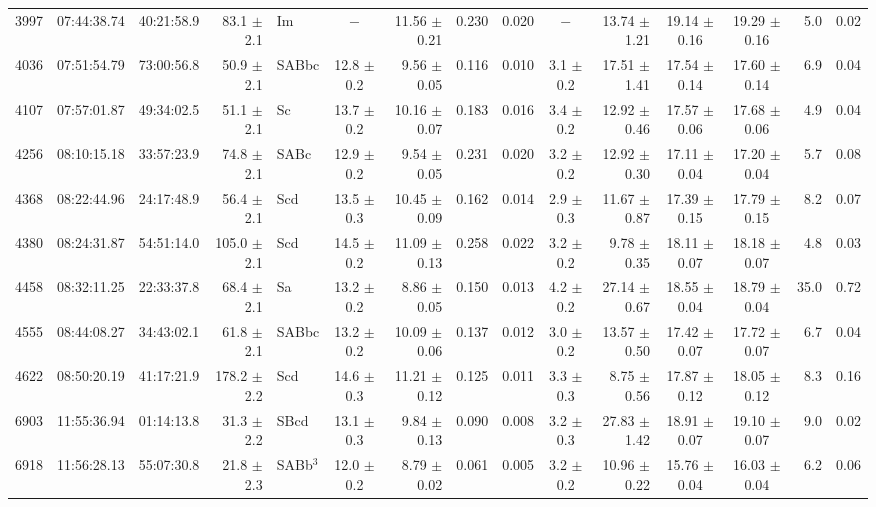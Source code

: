 \begin{table}
{\begin{tabular}{|rrrrlcrcccrccrc|}
 3997 & 07:44:38.74 & 40:21:58.9 &  83.1 $\pm$ 2.1 & Im        &       $-$      & 11.56 $\pm$ 0.21 & 0.230 & 0.020 &      $-$      & 13.74 $\pm$ 1.21 & 19.14 $\pm$ 0.16 & 19.29 $\pm$ 0.16 & 5.0  & 0.02 \\
 4036 & 07:51:54.79 & 73:00:56.8 &  50.9 $\pm$ 2.1 & SABbc     & 12.8 $\pm$ 0.2 &  9.56 $\pm$ 0.05 & 0.116 & 0.010 & 3.1 $\pm$ 0.2 & 17.51 $\pm$ 1.41 & 17.54 $\pm$ 0.14 & 17.60 $\pm$ 0.14 & 6.9  & 0.04 \\
 4107 & 07:57:01.87 & 49:34:02.5 &  51.1 $\pm$ 2.1 & Sc        & 13.7 $\pm$ 0.2 & 10.16 $\pm$ 0.07 & 0.183 & 0.016 & 3.4 $\pm$ 0.2 & 12.92 $\pm$ 0.46 & 17.57 $\pm$ 0.06 & 17.68 $\pm$ 0.06 & 4.9  & 0.04 \\
 4256 & 08:10:15.18 & 33:57:23.9 &  74.8 $\pm$ 2.1 & SABc      & 12.9 $\pm$ 0.2 &  9.54 $\pm$ 0.05 & 0.231 & 0.020 & 3.2 $\pm$ 0.2 & 12.92 $\pm$ 0.30 & 17.11 $\pm$ 0.04 & 17.20 $\pm$ 0.04 & 5.7  & 0.08 \\
 4368 & 08:22:44.96 & 24:17:48.9 &  56.4 $\pm$ 2.1 & Scd       & 13.5 $\pm$ 0.3 & 10.45 $\pm$ 0.09 & 0.162 & 0.014 & 2.9 $\pm$ 0.3 & 11.67 $\pm$ 0.87 & 17.39 $\pm$ 0.15 & 17.79 $\pm$ 0.15 & 8.2  & 0.07 \\
 4380 & 08:24:31.87 & 54:51:14.0 & 105.0 $\pm$ 2.1 & Scd       & 14.5 $\pm$ 0.2 & 11.09 $\pm$ 0.13 & 0.258 & 0.022 & 3.2 $\pm$ 0.2 &  9.78 $\pm$ 0.35 & 18.11 $\pm$ 0.07 & 18.18 $\pm$ 0.07 & 4.8  & 0.03 \\
 4458 & 08:32:11.25 & 22:33:37.8 &  68.4 $\pm$ 2.1 & Sa        & 13.2 $\pm$ 0.2 &  8.86 $\pm$ 0.05 & 0.150 & 0.013 & 4.2 $\pm$ 0.2 & 27.14 $\pm$ 0.67 & 18.55 $\pm$ 0.04 & 18.79 $\pm$ 0.04 & 35.0 & 0.72 \\
 4555 & 08:44:08.27 & 34:43:02.1 &  61.8 $\pm$ 2.1 & SABbc     & 13.2 $\pm$ 0.2 & 10.09 $\pm$ 0.06 & 0.137 & 0.012 & 3.0 $\pm$ 0.2 & 13.57 $\pm$ 0.50 & 17.42 $\pm$ 0.07 & 17.72 $\pm$ 0.07 & 6.7  & 0.04 \\
 4622 & 08:50:20.19 & 41:17:21.9 & 178.2 $\pm$ 2.2 & Scd       & 14.6 $\pm$ 0.3 & 11.21 $\pm$ 0.12 & 0.125 & 0.011 & 3.3 $\pm$ 0.3 &  8.75 $\pm$ 0.56 & 17.87 $\pm$ 0.12 & 18.05 $\pm$ 0.12 & 8.3  & 0.16 \\
 6903 & 11:55:36.94 & 01:14:13.8 &  31.3 $\pm$ 2.2 & SBcd      & 13.1 $\pm$ 0.3 &  9.84 $\pm$ 0.13 & 0.090 & 0.008 & 3.2 $\pm$ 0.3 & 27.83 $\pm$ 1.42 & 18.91 $\pm$ 0.07 & 19.10 $\pm$ 0.07 & 9.0  & 0.02 \\
 6918 & 11:56:28.13 & 55:07:30.8 &  21.8 $\pm$ 2.3 & SABb$^3$  & 12.0 $\pm$ 0.2 &  8.79 $\pm$ 0.02 & 0.061 & 0.005 & 3.2 $\pm$ 0.2 & 10.96 $\pm$ 0.22 & 15.76 $\pm$ 0.04 & 16.03 $\pm$ 0.04 & 6.2  & 0.06 \\

\end{tabular}}
\end{table}
